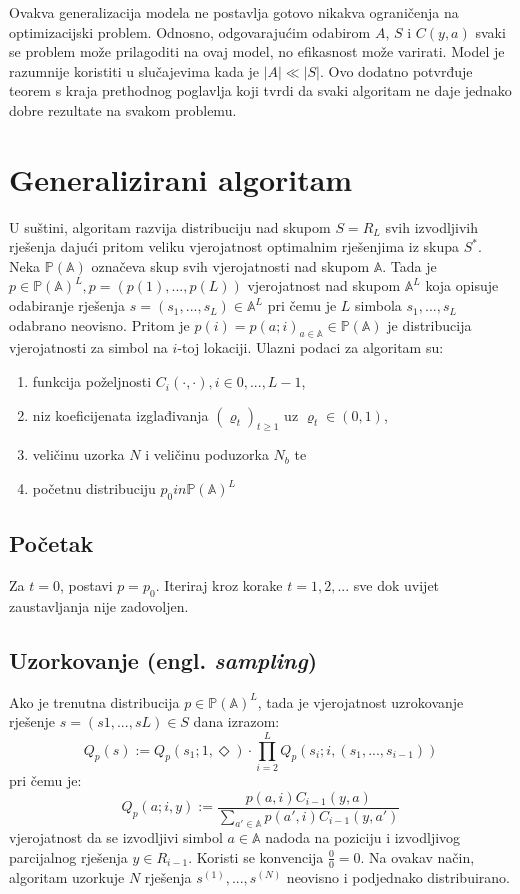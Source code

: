 \documentclass[times, utf8, zavrsni]{fer}
\begin{document}
Ovakva generalizacija modela ne postavlja gotovo nikakva ograničenja na optimizacijski problem. Odnosno, odgovarajućim odabirom
$A$, $S$ i $C(y, a)$ svaki se problem može prilagoditi na ovaj model, no efikasnost može varirati. Model je razumnije koristiti u slučajevima kada je $|A| \ll |S|$. Ovo dodatno potvrđuje teorem s kraja prethodnog poglavlja koji tvrdi da svaki algoritam ne daje jednako dobre rezultate na svakom problemu.



\section{Generalizirani algoritam}
U suštini, algoritam razvija distribuciju nad skupom $S=R_L$ svih izvodljivih rješenja dajući pritom veliku vjerojatnost optimalnim rješenjima iz skupa $S^*$.
Neka $\mathbb{P}(\mathbb{A})$ označeva skup svih vjerojatnosti nad skupom $\mathbb{A}$. Tada je $p \in \mathbb{P}(\mathbb{A})^L, p = (p(1), . . . , p(L))$ vjerojatnost nad skupom $\mathbb{A}^L$ koja opisuje odabiranje rješenja
$s = (s_1,...,s_L) \in \mathbb{A}^L$ pri čemu je $L$ simbola $s_1,...,s_L$ odabrano neovisno. Pritom je
$p(i) = p(a;i)_{a \in \mathbb{A}} \in \mathbb{P}(\mathbb{A})$ je distribucija vjerojatnosti za simbol na $i$-toj lokaciji.
Ulazni podaci za algoritam su:
\begin{enumerate}
  \item funkcija poželjnosti $C_i(\cdot, \cdot), i \in {0,..., L-1}$,
  \item niz koeficijenata izglađivanja $(\varrho_t)_{t \geq 1}$ uz $\varrho_t \in (0, 1)$,
  \item veličinu uzorka $N$ i veličinu poduzorka $N_b$ te
  \item početnu distribuciju $p_0 in \mathbb{P}(\mathbb{A})^L$
\end{enumerate}

\subsection{Početak}
Za $t = 0$, postavi $p = p_0$. Iteriraj kroz korake $t = 1, 2,...$ sve dok uvijet zaustavljanja nije zadovoljen.

\subsection{Uzorkovanje (engl. \textit{sampling})}
Ako je trenutna distribucija $p \in \mathbb{P}(\mathbb{A})^L$, tada je vjerojatnost uzrokovanje rješenje $s = (s1,...,sL) \in S$ dana izrazom:
$$
Q_p(s) := Q_p(s_1; 1, \Diamond) \cdot \prod^L_{i=2} Q_p(s_i;i, (s_1,...,s_{i-1}))
$$
pri čemu je:
$$
Q_p(a;i, y) := \frac{p(a, i)C_{i-1}(y, a)}{\sum_{a' \in \mathbb{A}} p(a', i)C_{i-1}(y, a') }
$$
vjerojatnost da se izvodljivi simbol $a \in \mathbb{A}$ nadoda na poziciju i izvodljivog parcijalnog rješenja $y \in R_{i-1}$. Koristi se konvencija $\frac{0}{0} = 0$.
Na ovakav način, algoritam uzorkuje $N$ rješenja $s^{(1)},...,s^{(N)}$ neovisno i podjednako distribuirano.
\end{document}
